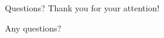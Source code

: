 \documentclass{beamer}
\begin{document}
\begin{frame}{Questions?}
  \centering
  \huge Thank you for your attention!
  
  \vspace{1cm}
  
  \large Any questions?
\end{frame}
\end{document}
